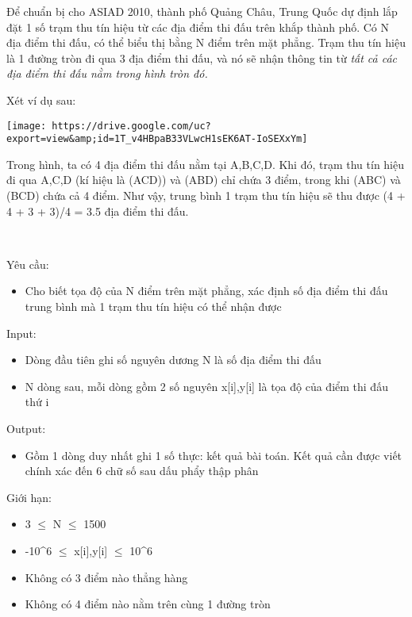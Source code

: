 

Để chuẩn bị cho ASIAD 2010, thành phố Quảng Châu, Trung Quốc dự định lắp đặt 1 số trạm thu tín hiệu từ các địa điểm thi đấu trên khắp thành phố. Có N địa điểm thi đấu, có thể biểu thị bằng N điểm trên mặt phẳng. Trạm thu tín hiệu là 1 đường tròn đi qua 3 địa điểm thi đấu, và nó sẽ nhận thông tin từ \emph{ tất cả các địa điểm thi đấu nằm trong hình tròn đó. }

Xét ví dụ sau:


\texttt{[image: https://drive.google.com/uc?export=view\&amp;id=1T\_v4HBpaB33VLwcH1sEK6AT-IoSEXxYm]}

Trong hình, ta có 4 địa điểm thi đấu nằm tại A,B,C,D. Khi đó, trạm thu tín hiệu đi qua A,C,D (kí hiệu là (ACD)) và (ABD) chỉ chứa 3 điểm, trong khi (ABC) và (BCD) chứa cả 4 điểm. Như vậy, trung bình 1 trạm thu tín hiệu sẽ thu được (4 + 4 + 3 + 3)/4 = 3.5 địa điểm thi đấu.

 

Yêu cầu:
\begin{itemize}
	\item 

Cho biết tọa độ của N điểm trên mặt phẳng, xác định số địa điểm thi đấu trung bình mà 1 trạm thu tín hiệu có thể nhận được
\end{itemize}

Input:
\begin{itemize}
	\item 

Dòng đầu tiên ghi số nguyên dương N là số địa điểm thi đấu
	\item 

N dòng sau, mỗi dòng gồm 2 số nguyên x[i],y[i] là tọa độ của điểm thi đấu thứ i
\end{itemize}

Output:
\begin{itemize}
	\item 

Gồm 1 dòng duy nhất ghi 1 số thực: kết quả bài toán. Kết quả cần được viết chính xác đến 6 chữ số sau dấu phẩy thập phân
\end{itemize}

Giới hạn:
\begin{itemize}
	\item 

3  $\le$  N  $\le$  1500
	\item 

-10\textasciicircum6  $\le$  x[i],y[i]  $\le$  10\textasciicircum6
	\item 

Không có 3 điểm nào thẳng hàng
	\item 

Không có 4 điểm nào nằm trên cùng 1 đường tròn
\end{itemize}

